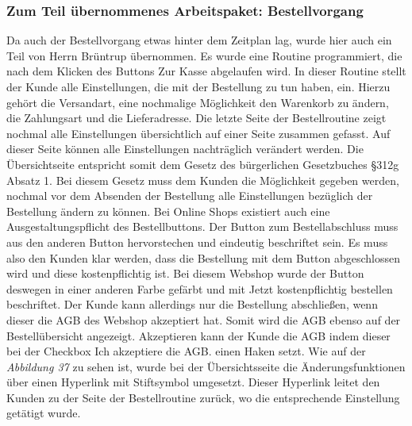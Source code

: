 \subsubsection{Zum Teil übernommenes Arbeitspaket: Bestellvorgang}
Da auch der Bestellvorgang etwas hinter dem Zeitplan lag, wurde hier auch ein Teil von Herrn Brüntrup übernommen. Es wurde eine Routine programmiert, die nach dem Klicken des Buttons \glqq Zur Kasse\grqq{} abgelaufen wird. In dieser Routine stellt der Kunde alle Einstellungen, die mit der Bestellung zu tun haben, ein. Hierzu gehört die Versandart, eine nochmalige Möglichkeit den Warenkorb zu ändern, die Zahlungsart und die Lieferadresse. Die letzte Seite der Bestellroutine zeigt nochmal alle Einstellungen übersichtlich auf einer Seite zusammen gefasst. Auf dieser Seite können alle Einstellungen nachträglich verändert werden. Die Übersichtseite entspricht somit dem Gesetz des bürgerlichen Gesetzbuches §312g Absatz 1. Bei diesem Gesetz muss dem Kunden die Möglichkeit gegeben werden, nochmal vor dem Absenden der Bestellung alle Einstellungen bezüglich der Bestellung ändern zu können. Bei Online Shops existiert auch eine \glqq Ausgestaltungspflicht des Bestellbuttons\grqq{}. Der Button zum Bestellabschluss muss aus den anderen Button hervorstechen und eindeutig beschriftet sein. Es muss also den Kunden klar werden, dass die Bestellung mit dem Button abgeschlossen wird und diese kostenpflichtig ist. Bei diesem Webshop wurde der Button deswegen in einer anderen Farbe gefärbt und mit \glqq Jetzt kostenpflichtig bestellen\grqq{} beschriftet. Der Kunde kann allerdings nur die Bestellung abschließen, wenn dieser die AGB des Webshop akzeptiert hat. Somit wird die AGB ebenso auf der Bestellübersicht angezeigt. Akzeptieren kann der Kunde die AGB indem dieser bei der Checkbox \glqq Ich akzeptiere die AGB.\grqq{} einen Haken setzt. Wie auf der \textit{Abbildung 37} zu sehen ist, wurde bei der Übersichtsseite die Änderungsfunktionen über einen Hyperlink mit Stiftsymbol umgesetzt. Dieser Hyperlink leitet den Kunden zu der Seite der Bestellroutine zurück, wo die entsprechende Einstellung getätigt wurde.

